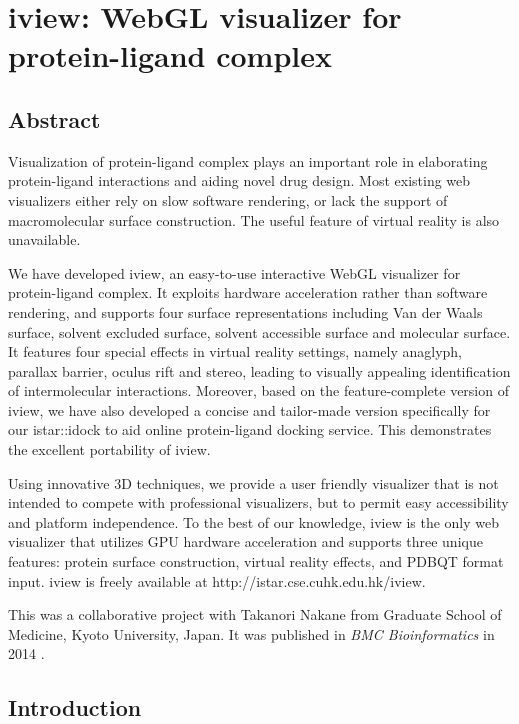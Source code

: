 \chapter{iview: WebGL visualizer for protein-ligand complex}

\section{Abstract}

Visualization of protein-ligand complex plays an important role in elaborating protein-ligand interactions and aiding novel drug design. Most existing web visualizers either rely on slow software rendering, or lack the support of macromolecular surface construction. The useful feature of virtual reality is also unavailable.

We have developed iview, an easy-to-use interactive WebGL visualizer for protein-ligand complex. It exploits hardware acceleration rather than software rendering, and supports four surface representations including Van der Waals surface, solvent excluded surface, solvent accessible surface and molecular surface. It features four special effects in virtual reality settings, namely anaglyph, parallax barrier, oculus rift and stereo, leading to visually appealing identification of intermolecular interactions. Moreover, based on the feature-complete version of iview, we have also developed a concise and tailor-made version specifically for our istar::idock to aid online protein-ligand docking service. This demonstrates the excellent portability of iview.

Using innovative 3D techniques, we provide a user friendly visualizer that is not intended to compete with professional visualizers, but to permit easy accessibility and platform independence. To the best of our knowledge, iview is the only web visualizer that utilizes GPU hardware acceleration and supports three unique features: protein surface construction, virtual reality effects, and PDBQT format input. iview is freely available at http://istar.cse.cuhk.edu.hk/iview.

This was a collaborative project with Takanori Nakane from Graduate School of Medicine, Kyoto University, Japan. It was published in \textit{BMC Bioinformatics} in 2014 \citep{1366}.

\section{Introduction}

